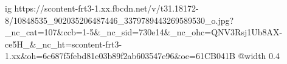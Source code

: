  
 
 
 
 

\ifcmt
  ig https://scontent-frt3-1.xx.fbcdn.net/v/t31.18172-8/10848535_902035206487446_3379789443269589530_o.jpg?_nc_cat=107&ccb=1-5&_nc_sid=730e14&_nc_ohc=QNV3Rsj1Ub8AX-ce5H_&_nc_ht=scontent-frt3-1.xx&oh=6c687f5febd81e03b89f2ab603547e96&oe=61CB041B
  @width 0.4
\fi
